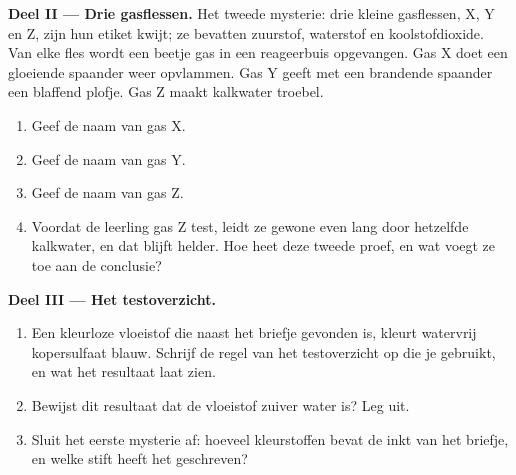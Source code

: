 \begin{problem}
\medskip
\noindent\textbf{Deel II --- Drie gasflessen.}
Het tweede mysterie: drie kleine gasflessen, X, Y en Z, zijn hun etiket
kwijt; ze bevatten zuurstof, waterstof en koolstofdioxide. Van elke fles
wordt een beetje gas in een reageerbuis opgevangen. Gas X doet een
gloeiende spaander weer opvlammen. Gas Y geeft met een brandende
spaander een blaffend plofje. Gas Z maakt kalkwater troebel.
\begin{enumerate}[resume]
  \item Geef de naam van gas X.
  \item Geef de naam van gas Y.
  \item Geef de naam van gas Z.
  \item Voordat de leerling gas Z test, leidt ze gewone  even lang
        door hetzelfde kalkwater, en dat blijft helder. Hoe heet deze
        tweede proef, en wat voegt ze toe aan de conclusie?
\end{enumerate}

\medskip
\noindent\textbf{Deel III --- Het testoverzicht.}
\begin{enumerate}[resume]
  \item Een kleurloze vloeistof die naast het briefje gevonden is, kleurt
        watervrij kopersulfaat blauw. Schrijf de regel van het
        testoverzicht op die je gebruikt, en wat het resultaat laat zien.
  \item Bewijst dit resultaat dat de vloeistof zuiver water is? Leg uit.
  \item Sluit het eerste mysterie af: hoeveel kleurstoffen bevat de inkt
        van het briefje, en welke stift heeft het geschreven?
\end{enumerate}
\end{problem}
